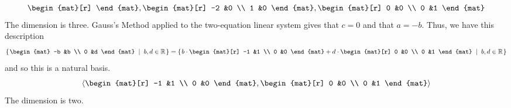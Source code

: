 \begin{Answer}
\begin{equation*}
{\begin{mat}[r]
            \end{mat},
            \begin{mat}[r]
              -2  &0  \\
               1  &0
            \end{mat},
            \begin{mat}[r]
              0  &0  \\
              0  &1
            \end{mat}  }
        \end{equation*}
        The dimension is three. 
\Question Gauss's Method applied to the two-equation linear system gives
        that $c=0$ and that $a=-b$.
        Thus, we have this description
        \begin{equation*}
         \set{\begin{mat}
               -b  &b  \\
                0  &d
             \end{mat} \suchthat b,d\in\Re}
         =\set{b\cdot\begin{mat}[r]
             -1  &1  \\
             0  &0
           \end{mat}
           +d\cdot\begin{mat}[r]
             0  &0  \\
             0  &1
           \end{mat} \suchthat b,d\in\Re}
        \end{equation*}
        and so this is a natural basis.
        \begin{equation*}
          \sequence{
            \begin{mat}[r]
              -1  &1  \\
               0  &0
            \end{mat},
            \begin{mat}[r]
              0  &0  \\
              0  &1
            \end{mat}  }
        \end{equation*}
        The dimension is two. 
\end{Answer}
